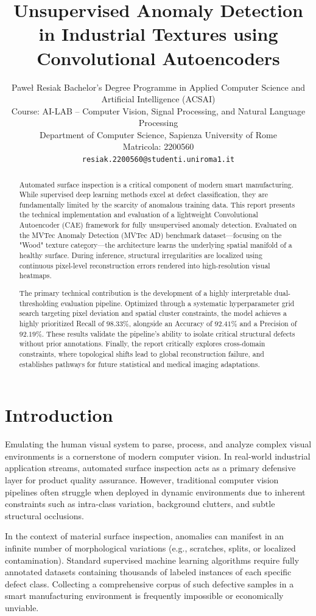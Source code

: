 \documentclass[10pt,twocolumn,a4paper]{article}
\title{\textbf{Unsupervised Anomaly Detection in Industrial Textures using Convolutional Autoencoders}}
\author{
	Paweł Resiak
	Bachelor's Degree Programme in Applied Computer Science and Artificial Intelligence (ACSAI)\\
	Course: AI-LAB -- Computer Vision, Signal Processing, and Natural Language Processing\\
	Department of Computer Science, Sapienza University of Rome\\
	Matricola: 2200560\\
	\texttt{resiak.2200560@studenti.uniroma1.it}\\
}
\date{}
\begin{document}
	
	\maketitle
	
	\begin{abstract}
Automated surface inspection is a critical component of modern smart manufacturing. While supervised deep learning methods excel at defect classification, they are fundamentally limited by the scarcity of anomalous training data. This report presents the technical implementation and evaluation of a lightweight Convolutional Autoencoder (CAE) framework for fully unsupervised anomaly detection. Evaluated on the MVTec Anomaly Detection (MVTec AD) benchmark dataset—focusing on the "Wood" texture category—the architecture learns the underlying spatial manifold of a healthy surface. During inference, structural irregularities are localized using continuous pixel-level reconstruction errors rendered into high-resolution visual heatmaps.

The primary technical contribution is the development of a highly interpretable dual-thresholding evaluation pipeline. Optimized through a systematic hyperparameter grid search targeting pixel deviation and spatial cluster constraints, the model achieves a highly prioritized Recall of $98.33\%$, alongside an Accuracy of $92.41\%$ and a Precision of $92.19\%$. These results validate the pipeline's ability to isolate critical structural defects without prior annotations. Finally, the report critically explores cross-domain constraints, where topological shifts lead to global reconstruction failure, and establishes pathways for future statistical and medical imaging adaptations.
\end{abstract}

\section{Introduction}
Emulating the human visual system to parse, process, and analyze complex visual environments is a cornerstone of modern computer vision. In real-world industrial application streams, automated surface inspection acts as a primary defensive layer for product quality assurance. However, traditional computer vision pipelines often struggle when deployed in dynamic environments due to inherent constraints such as intra-class variation, background clutters, and subtle structural occlusions. 

In the context of material surface inspection, anomalies can manifest in an infinite number of morphological variations (e.g., scratches, splits, or localized contamination). Standard supervised machine learning algorithms require fully annotated datasets containing thousands of labeled instances of each specific defect class. Collecting a comprehensive corpus of such defective samples in a smart manufacturing environment is frequently impossible or economically unviable.
\end{document}
